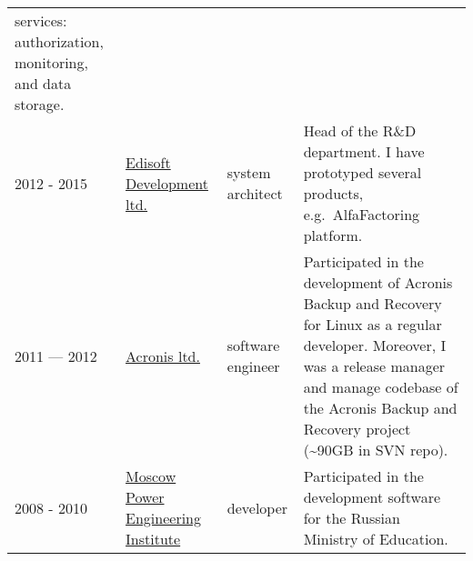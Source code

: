 \documentclass{article}
\begin{document}
\begin{longtable}[]{@{}llll@{}}
\begin{minipage}[t]{0.22\columnwidth}
    services: authorization, monitoring, and data storage.\strut
  \end{minipage}\tabularnewline
  \begin{minipage}[t]{0.22\columnwidth}\raggedright
    2012 - 2015\strut
  \end{minipage} & \begin{minipage}[t]{0.22\columnwidth}\raggedright
    \href{https://ediweb.com}{Edisoft Development ltd.}\strut
  \end{minipage} & \begin{minipage}[t]{0.22\columnwidth}\raggedright
    system architect\strut
  \end{minipage} & \begin{minipage}[t]{0.22\columnwidth}\raggedright
    Head of the R\&D department. I have prototyped several products,
    e.g.~AlfaFactoring platform.\strut
  \end{minipage}\tabularnewline
  \begin{minipage}[t]{0.22\columnwidth}\raggedright
    2011 --- 2012\strut
  \end{minipage} & \begin{minipage}[t]{0.22\columnwidth}\raggedright
    \href{http://www.acronis.com}{Acronis ltd.}\strut
  \end{minipage} & \begin{minipage}[t]{0.22\columnwidth}\raggedright
    software engineer\strut
  \end{minipage} & \begin{minipage}[t]{0.22\columnwidth}\raggedright
    Participated in the development of Acronis Backup and Recovery for Linux
    as a regular developer. Moreover, I was a release manager and manage
    codebase of the Acronis Backup and Recovery project (\textasciitilde90GB
    in SVN repo).\strut
  \end{minipage}\tabularnewline
  \begin{minipage}[t]{0.22\columnwidth}\raggedright
    2008 - 2010\strut
  \end{minipage} & \begin{minipage}[t]{0.22\columnwidth}\raggedright
    \href{https://mpei.ru/lang/en/Pages/default.aspx}{Moscow Power
    Engineering Institute}\strut
  \end{minipage} & \begin{minipage}[t]{0.22\columnwidth}\raggedright
    developer\strut
  \end{minipage} & \begin{minipage}[t]{0.22\columnwidth}\raggedright
    Participated in the development software for the Russian Ministry of
    Education.\strut
  \end{minipage}\tabularnewline
  \bottomrule
\end{longtable}
\end{document}
